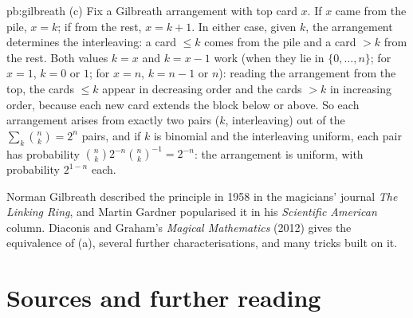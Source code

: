 \begin{solution}{pb:gilbreath}
(c) Fix a Gilbreath arrangement with top card $x$. If $x$ came from the pile, $x=k$; if from the rest, $x=k+1$. In either case, given $k$, the
arrangement determines the interleaving: a card $\le k$ comes from the pile and a card $>k$ from the rest. Both values $k=x$ and $k=x-1$ work (when
they lie in $\{0,\dots,n\}$; for $x=1$, $k=0$ or $1$; for $x=n$, $k=n-1$ or $n$): reading the arrangement from the top, the cards $\le k$ appear in decreasing
order and the cards $>k$ in increasing order, because each new card extends the block below or above. So each arrangement arises from
exactly two pairs ($k$, interleaving) out of the $\sum_k\binom nk=2^n$ pairs, and if $k$ is binomial and the interleaving uniform, each pair has probability
$\binom nk2^{-n}\binom nk^{-1}=2^{-n}$: the arrangement is uniform, with probability $2^{1-n}$ each.

\leads Norman Gilbreath described the principle in 1958 in the magicians' journal \emph{The Linking Ring}, and Martin Gardner popularised it
in his \emph{Scientific American} column. Diaconis and Graham's \emph{Magical Mathematics} (2012) gives the equivalence of (a), several further
characterisations, and many tricks built on it.
\end{solution}

\section*{Sources and further reading}

